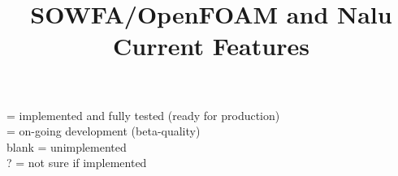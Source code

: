 \documentclass{article}
\begin{document}
\title{SOWFA/OpenFOAM and Nalu Current Features}
\maketitle




\noindent
\CIRCLE = implemented and fully tested (ready for production) \\
\LEFTcircle = on-going development (beta-quality) \\
blank = unimplemented \\
? = not sure if implemented \\
\end{document}
